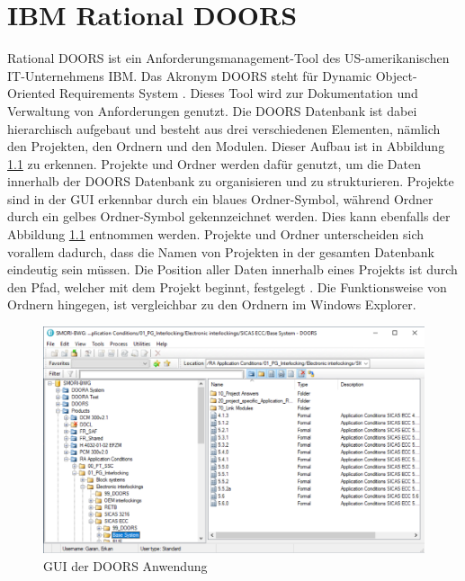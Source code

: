 \chapter{IBM Rational DOORS}
\label{chap:kapitel3}

Rational DOORS ist ein Anforderungsmanagement-Tool des US-amerikanischen IT-Unternehmens IBM. Das Akronym \acs{DOORS} steht für Dynamic Object-Oriented Requirements System \cite[]{q5}.
Dieses Tool wird zur Dokumentation und Verwaltung von Anforderungen genutzt. Die \acs{DOORS} Datenbank ist dabei hierarchisch aufgebaut und besteht aus drei verschiedenen Elementen, nämlich den 
Projekten, den Ordnern und den Modulen. Dieser Aufbau ist in Abbildung \ref*{fig:Doors GUI} zu erkennen. Projekte und Ordner werden dafür genutzt, um die Daten innerhalb der \acs{DOORS} Datenbank 
zu organisieren und zu strukturieren. Projekte sind in der GUI erkennbar durch ein blaues Ordner-Symbol, während Ordner durch ein gelbes Ordner-Symbol gekennzeichnet werden. Dies kann ebenfalls der 
Abbildung \ref*{fig:Doors GUI} entnommen werden. Projekte und Ordner unterscheiden sich vorallem dadurch, dass die Namen von Projekten in der gesamten Datenbank eindeutig sein müssen. 
Die Position aller Daten innerhalb eines Projekts ist durch den Pfad, welcher mit dem Projekt beginnt, festgelegt \cite[]{q6}. Die Funktionsweise von Ordnern hingegen, ist vergleichbar 
zu den Ordnern im Windows Explorer.     

\begin{figure}[H]
    \centering
    \includegraphics[width = \textwidth]{abbildungen/IBM Doors.PNG}
    \caption{GUI der \acs{DOORS} Anwendung}
    \label{fig:Doors GUI}
\end{figure}

